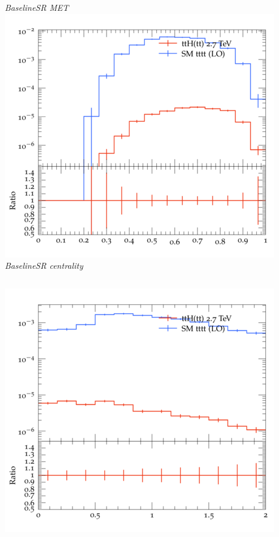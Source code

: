 \documentclass{beamer}
\begin{document}
\begin{frame}
\begin{columns}
\textit{\small BaselineSR MET}
\includegraphics[width=\textwidth]{../plots/ttH_2700/tttt_ttH_1LOS/BaselineSR_centrality.png}\\
\textit{\small BaselineSR centrality}
\end{columns}
\begin{columns}
\includegraphics[width=\textwidth]{../plots/ttH_2700/tttt_ttH_1LOS/BaselineSR_deltaR_bl_min.png}\\

\end{columns}
\end{frame}
\end{document}
